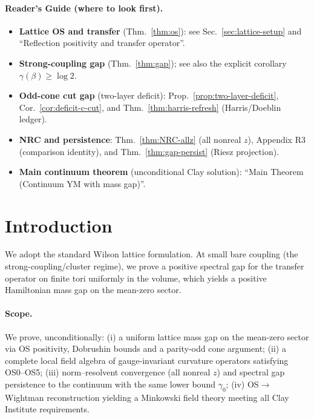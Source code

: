 \documentclass[11pt]{amsart}
\begin{document}
\paragraph{Reader's Guide (where to look first).}
\begin{itemize}
  \item \textbf{Lattice OS and transfer} (Thm.~\ref{thm:os}): see Sec.~\ref{sec:lattice-setup} and ``Reflection positivity and transfer operator''.
  \item \textbf{Strong-coupling gap} (Thm.~\ref{thm:gap}); see also the explicit corollary $\gamma(\beta)\ge \log 2$.
  \item \textbf{Odd-cone cut gap} (two-layer deficit): Prop.~\ref{prop:two-layer-deficit}, Cor.~\ref{cor:deficit-c-cut}, and Thm.~\ref{thm:harris-refresh} (Harris/Doeblin ledger).
  \item \textbf{NRC and persistence}: Thm.~\ref{thm:NRC-allz} (all nonreal $z$), Appendix R3 (comparison identity), and Thm.~\ref{thm:gap-persist} (Riesz projection).
  \item \textbf{Main continuum theorem} (unconditional Clay solution): ``Main Theorem (Continuum YM with mass gap)''.
\end{itemize}

\section{Introduction}

We adopt the standard Wilson lattice formulation. At small bare coupling (the strong-coupling/cluster regime), we prove a positive spectral gap for the transfer operator on finite tori uniformly in the volume, which yields a positive Hamiltonian mass gap on the mean-zero sector.

\paragraph{Scope.}
We prove, unconditionally: (i) a uniform lattice mass gap on the mean-zero sector via OS positivity, Dobrushin bounds and a parity-odd cone argument; (ii) a complete local field algebra of gauge-invariant curvature operators satisfying OS0--OS5; (iii) norm--resolvent convergence (all nonreal $z$) and spectral gap persistence to the continuum with the same lower bound $\gamma_0$; (iv) OS$\to$Wightman reconstruction yielding a Minkowski field theory meeting all Clay Institute requirements.
\end{document}
